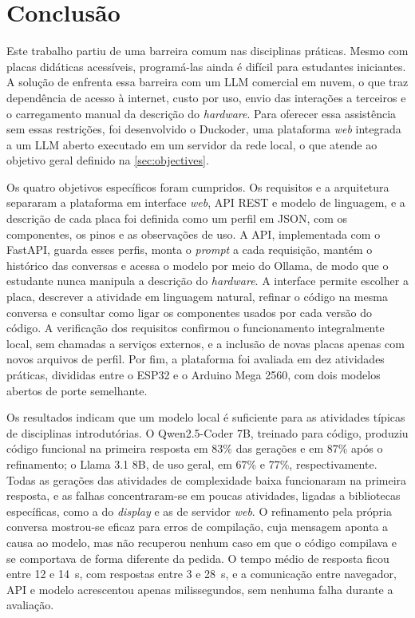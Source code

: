 
\chapter{Conclusão}
\label{chap:conclusion}

Este trabalho partiu de uma barreira comum nas disciplinas práticas. Mesmo com placas didáticas acessíveis, programá-las ainda é difícil para estudantes iniciantes. A solução de  enfrenta essa barreira com um LLM comercial em nuvem, o que traz dependência de acesso à internet, custo por uso, envio das interações a terceiros e o carregamento manual da descrição do \textit{hardware}. Para oferecer essa assistência sem essas restrições, foi desenvolvido o Duckoder, uma plataforma \textit{web} integrada a um LLM aberto executado em um servidor da rede local, o que atende ao objetivo geral definido na \autoref{sec:objectives}.

Os quatro objetivos específicos foram cumpridos. Os requisitos e a arquitetura separaram a plataforma em interface \textit{web}, API REST e modelo de linguagem, e a descrição de cada placa foi definida como um perfil em JSON, com os componentes, os pinos e as observações de uso. A API, implementada com o FastAPI, guarda esses perfis, monta o \textit{prompt} a cada requisição, mantém o histórico das conversas e acessa o modelo por meio do Ollama, de modo que o estudante nunca manipula a descrição do \textit{hardware}. A interface permite escolher a placa, descrever a atividade em linguagem natural, refinar o código na mesma conversa e consultar como ligar os componentes usados por cada versão do código. A verificação dos requisitos confirmou o funcionamento integralmente local, sem chamadas a serviços externos, e a inclusão de novas placas apenas com novos arquivos de perfil. Por fim, a plataforma foi avaliada em dez atividades práticas, divididas entre o ESP32 e o Arduino Mega 2560, com dois modelos abertos de porte semelhante.

Os resultados indicam que um modelo local é suficiente para as atividades típicas de disciplinas introdutórias. O Qwen2.5-Coder 7B, treinado para código, produziu código funcional na primeira resposta em 83\% das gerações e em 87\% após o refinamento; o Llama 3.1 8B, de uso geral, em 67\% e 77\%, respectivamente. Todas as gerações das atividades de complexidade baixa funcionaram na primeira resposta, e as falhas concentraram-se em poucas atividades, ligadas a bibliotecas específicas, como a do \textit{display} e as de servidor \textit{web}. O refinamento pela própria conversa mostrou-se eficaz para erros de compilação, cuja mensagem aponta a causa ao modelo, mas não recuperou nenhum caso em que o código compilava e se comportava de forma diferente da pedida. O tempo médio de resposta ficou entre 12 e 14~s, com respostas entre 3 e 28~s, e a comunicação entre navegador, API e modelo acrescentou apenas milissegundos, sem nenhuma falha durante a avaliação.

